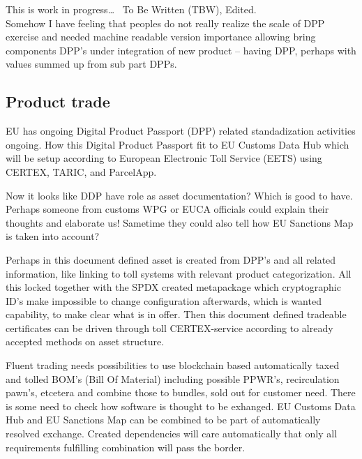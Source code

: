This is work in progress\ldots~ To Be Written (TBW), Edited.
\\

Somehow I have feeling that peoples do not really realize the scale of
DPP exercise and needed machine readable version importance allowing
bring components DPP's under integration of new product -- having DPP,
perhaps with values summed up from sub part DPPs.


\subsection{Product trade}\label{product_trade}

EU has ongoing Digital Product Passport (DPP) related standadization
activities ongoing\allowbreak\cite{DPP}\allowbreak\cite{
GD_DBP}\allowbreak\cite{EuRepairableGoods}\allowbreak\cite{EU2024_825}.
How this Digital Product Passport fit to EU Customs Data
Hub\allowbreak\cite{EUCustomsDataHub} which will be setup according to
European Electronic Toll Service (EETS)\allowbreak\cite{EETS} using
CERTEX\allowbreak\cite{CERTEX}, TARIC\allowbreak\cite{TARIC}, and
ParcelApp.

Now it looks like DDP have role as asset documentation? Which is good to
have. Perhaps someone from customs WPG\allowbreak\cite{CustomsWPG} or
EUCA\allowbreak\cite{EUCA} officials could explain their thoughts and
elaborate us! Sametime they could also tell how EU Sanctions
Map\allowbreak\cite{EuSanctionsMap} is taken into account?

Perhaps in this document defined asset is created from DPP's and all related
information, like linking to toll systems with relevant product categorization.
All this locked together with the SPDX created metapackage which cryptographic
ID's make impossible to change configuration afterwards, which is wanted
capability, to make clear what is in offer. Then this document defined
tradeable certificates can be driven through toll
CERTEX\allowbreak\cite{CERTEX}-service according
to already accepted methods on asset structure.

Fluent trading needs possibilities to use blockchain based automatically
taxed and tolled BOM's (Bill Of Material) including possible
PPWR's\allowbreak\cite{PPWR}, recirculation pawn's, etcetera and combine
those to bundles, sold out for customer need. There is some need to check how
software is thought to be exhanged. EU Customs Data Hub and EU Sanctions Map
can be combined to be part of automatically resolved exchange. Created
dependencies will care automatically that only all requirements fulfilling
combination will pass the border.


